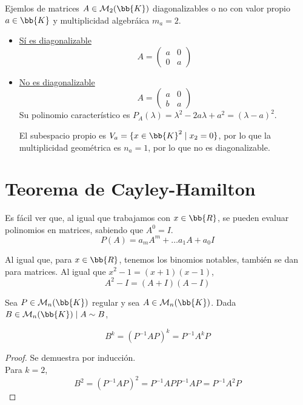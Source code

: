 \begin{ejemplo}
   Ejemlos de matrices $A \in \mathcal{M}_2(\bb{K})$ diagonalizables o no con valor propio $a\in \bb{K}$ y multiplicidad algebráica $m_a=2$.
   \begin{itemize}
       \item \underline{Sí es diagonalizable}
       \begin{equation*}
           A = \left( \begin{array}{cc}
               a & 0 \\
               0 & a
           \end{array} \right)
       \end{equation*}

       \item \underline{No es diagonalizable}
       \begin{equation*}
           A = \left( \begin{array}{cc}
               a & 0 \\
               b & a
           \end{array} \right)
       \end{equation*}
       Su polinomio característico es $P_A(\lambda) = \lambda^2 - 2a\lambda + a^2 = (\lambda-a)^2$.
       
       El subespacio propio es $V_a = \{x \in \bb{K}^2 \mid x_2 = 0\}$, por lo que la multiplicidad geométrica es $n_a=1$, por lo que no es diagonalizable.
   \end{itemize}
\end{ejemplo}

\section{Teorema de Cayley-Hamilton}

Es fácil ver que, al igual que trabajamos con $x\in \bb{R}$, se pueden evaluar polinomios en matrices, sabiendo que $A^0 = I$.
$$P(A) = a_mA^m + \dots a_1A + a_0I$$

Al igual que, para $x\in \bb{R}$, tenemos los binomios notables, también se dan para matrices. Al igual que $x^2-1 = (x+1)(x-1)$,$$A^2-I = (A+I)(A-I)$$

\begin{lema}
    Sea $P\in \mathcal{M}_n(\bb{K})$ regular y sea $A\in \mathcal{M}_n(\bb{K})$. Dada $B\in \mathcal{M}_n(\bb{K}) \mid A\sim B$,

    \begin{equation*}
        B^k = (P^{-1}AP)^k = P^{-1}A^kP
    \end{equation*}
\end{lema}
\begin{proof}
    Se demuestra por inducción.\\
    Para $k=2$,
    \begin{equation*}
        B^2 = (P^{-1}AP)^2 = P^{-1}APP^{-1}AP = P^{-1}A^2P
    \end{equation*}
\end{proof}

